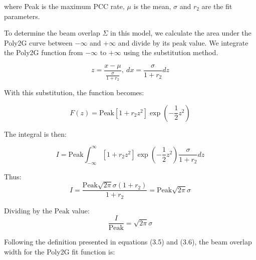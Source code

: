 where Peak is the maximum PCC rate, $\mu$ is the mean, $\sigma$ and $r_2$ are the fit parameters. 


To determine the beam overlap $\Sigma$ in this model, we calculate the area under the Poly2G curve between $-\infty$ and  +$\infty$ and divide by its peak value. We integrate the Poly2G function
from \(-\infty\) to \(+\infty\) using the substitution method.

\begin{equation}
z = \frac{x - \mu}{\frac{\sigma}{1 + r_2}} ,  \:  dx = \frac{\sigma}{1 + r_2} dz 
\end{equation}

With this substitution, the function becomes:

\begin{equation}
F(z) = \text{Peak} \left[ 1 + r_2 z^2 \right] \exp\left(-\frac{1}{2} z^2\right)
\end{equation}
  
The integral is then:

\begin{equation}
I = \text{Peak} \int_{-\infty}^{\infty} \left[ 1 + r_2 z^2 \right] \exp\left(-\frac{1}{2} z^2\right) \frac{\sigma}{1 + r_2} dz
\end{equation}






Thus:
\[ I = \frac{\text{Peak} \sqrt{2\pi} \sigma (1 + r_2) }{1+r_2} = \text{Peak} \sqrt{2\pi} \sigma \]

Dividing by the \(\text{Peak}\) value:
\[ \frac{I}{\text{Peak}} = \sqrt{2\pi} \sigma  \]

Following the definition presented in equations (3.5) and (3.6), the beam overlap width for the Poly2G fit function is:

